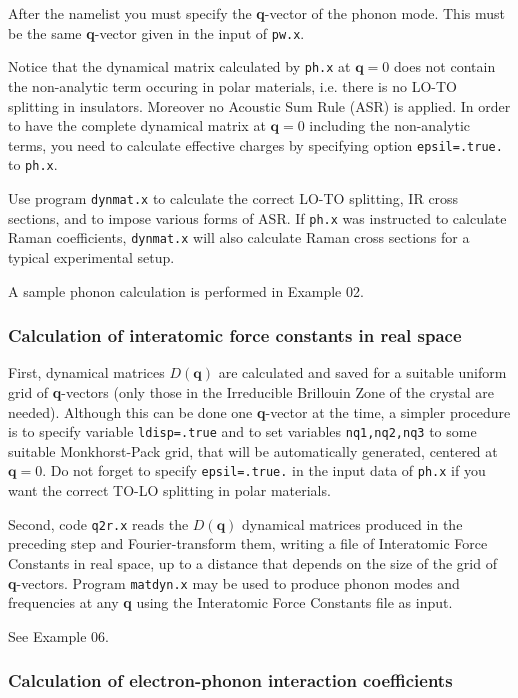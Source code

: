 \documentclass[12pt,a4paper]{article}
\begin{document}
After the namelist you must specify the \textbf{q}-vector of the
phonon mode.
This must be the same \textbf{q}-vector given in the input of
\texttt{pw.x}.

Notice that the dynamical matrix calculated by \texttt{ph.x}
at $\mathbf{q}=0$ does not contain the non-analytic term
occuring in polar materials, i.e. there is no LO-TO splitting
in insulators. Moreover no Acoustic Sum Rule (ASR) is applied.
In order to have the complete dynamical matrix at $\mathbf{q}=0$ 
including the non-analytic terms, you need to calculate effective 
charges by specifying option \texttt{epsil=.true.} to \texttt{ph.x}. 

Use program \texttt{dynmat.x} to calculate the correct LO-TO 
splitting, IR cross sections, and to impose various forms
of ASR. If \texttt{ph.x} was instructed to calculate Raman 
coefficients, \texttt{dynmat.x} will also calculate Raman cross 
sections for a typical experimental setup.

A sample phonon calculation is performed in Example 02.

\subsubsection{Calculation of interatomic force constants in real
space}

First, dynamical matrices $D(\mathbf{q})$ are calculated and saved 
for a suitable uniform grid of \textbf{q}-vectors (only those in the 
Irreducible Brillouin Zone of the crystal are needed). Although
this can be done one \textbf{q}-vector at the time, a simpler procedure
is to specify variable \texttt{ldisp=.true} and to set variables
\texttt{nq1,nq2,nq3} to some suitable Monkhorst-Pack grid, that
will be automatically generated, centered at $\mathbf{q}=0$.
Do not forget to specify \texttt{epsil=.true.} in the input data
of \texttt{ph.x} if you want the correct TO-LO splitting in 
polar materials. 

Second, code \texttt{q2r.x} reads the $D(\mathbf{q})$ dynamical 
matrices produced in the preceding step and Fourier-transform them,
writing a file of Interatomic Force Constants in real space, up
to a distance that depends on the size of the grid of
\textbf{q}-vectors.
Program \texttt{matdyn.x} may be used to produce phonon modes and
frequencies at any \textbf{q} using the Interatomic Force Constants
file as input.

See Example 06.

\subsubsection{Calculation of electron-phonon interaction
coefficients}
\end{document}
